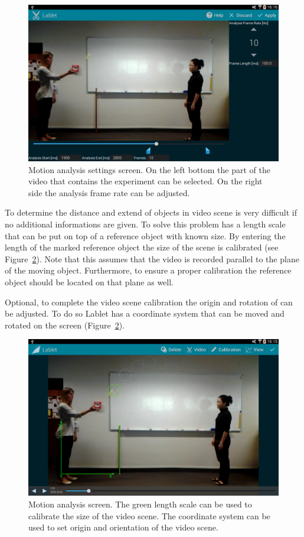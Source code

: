 \documentclass{sigchi}
\begin{document}
\begin{figure}[ht]
\centering
\includegraphics[width=.99\columnwidth]{MotionAnalysisSettings}
\caption{Motion analysis settings screen.
On the left bottom the part of the video that contains the experiment can be selected.
On the right side the analysis frame rate can be adjusted.\label{fig:MotionAnalysisSettingsScreen}
}
\end{figure}

To determine the distance and extend of objects in video scene is very difficult if no additional informations are given.
To solve this problem has a length scale that can be put on top of a reference object with known size.
By entering the length of the marked reference object the size of the scene is calibrated (see Figure~\ref{fig:MotionAnalysis}).
Note that this assumes that the video is recorded parallel to the plane of the moving object.
Furthermore, to ensure a proper calibration the reference object should be located on that plane as well.

Optional, to complete the video scene calibration the origin and rotation of can be adjusted.
To do so Lablet has a coordinate system that can be moved and rotated on the screen (Figure~\ref{fig:MotionAnalysis}).


\begin{figure}[ht]
\centering
\includegraphics[width=.99\columnwidth]{MotionAnalysis}
\caption{Motion analysis screen.
The green length scale can be used to calibrate the size of the video scene.
The coordinate system can be used to set origin and orientation of the video scene.\label{fig:MotionAnalysis}
}
\end{figure}
\end{document}
